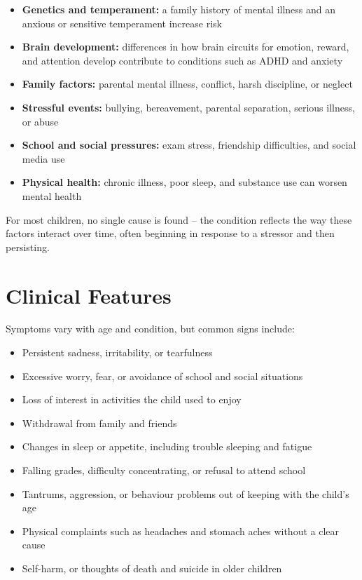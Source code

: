 \begin{itemize}
    \item \textbf{Genetics and temperament:} a family history of mental illness and an anxious or sensitive temperament increase risk
    \item \textbf{Brain development:} differences in how brain circuits for emotion, reward, and attention develop contribute to conditions such as ADHD and anxiety
    \item \textbf{Family factors:} parental mental illness, conflict, harsh discipline, or neglect
    \item \textbf{Stressful events:} bullying, bereavement, parental separation, serious illness, or abuse
    \item \textbf{School and social pressures:} exam stress, friendship difficulties, and social media use
    \item \textbf{Physical health:} chronic illness, poor sleep, and substance use can worsen mental health
\end{itemize}

For most children, no single cause is found -- the condition reflects the way these factors interact over time, often beginning in response to a stressor and then persisting.

\section*{Clinical Features}
Symptoms vary with age and condition, but common signs include:

\begin{itemize}
    \item Persistent sadness, irritability, or tearfulness
    \item Excessive worry, fear, or avoidance of school and social situations
    \item Loss of interest in activities the child used to enjoy
    \item Withdrawal from family and friends
    \item Changes in sleep or appetite, including trouble sleeping and fatigue
    \item Falling grades, difficulty concentrating, or refusal to attend school
    \item Tantrums, aggression, or behaviour problems out of keeping with the child's age
    \item Physical complaints such as headaches and stomach aches without a clear cause
    \item Self-harm, or thoughts of death and suicide in older children
\end{itemize}

